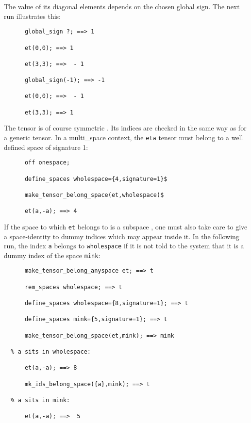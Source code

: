 The value of its diagonal elements depends on the chosen
global sign. The next run illustrates this:
\begin{verbatim}
      global_sign ?; ==> 1

      et(0,0); ==> 1

      et(3,3); ==>  - 1

      global_sign(-1); ==> -1

      et(0,0); ==>  - 1

      et(3,3); ==> 1
\end{verbatim}
The tensor is of course symmetric .
Its indices are checked in the same way as for a generic tensor.
In a multi\_space context, the \texttt{eta} tensor must belong
to a well defined space of 
signature 1:
\begin{verbatim}
      off onespace;

      define_spaces wholespace={4,signature=1}$

      make_tensor_belong_space(et,wholespace)$

      et(a,-a); ==> 4
\end{verbatim}
If the space to which \texttt{et} belongs to is a subspace%
,
one must also
take care to give a space-identity to dummy indices which may appear inside
it. In the following run, the index \texttt{a} belongs to \texttt{wholespace}
if it is not told to the system that it is a dummy
index of the space \texttt{mink}:
\begin{verbatim}
      make_tensor_belong_anyspace et; ==> t

      rem_spaces wholespace; ==> t

      define_spaces wholespace={8,signature=1}; ==> t

      define_spaces mink={5,signature=1}; ==> t

      make_tensor_belong_space(et,mink); ==> mink

  % a sits in wholespace:

      et(a,-a); ==> 8

      mk_ids_belong_space({a},mink); ==> t

  % a sits in mink:

      et(a,-a); ==>  5
\end{verbatim}

